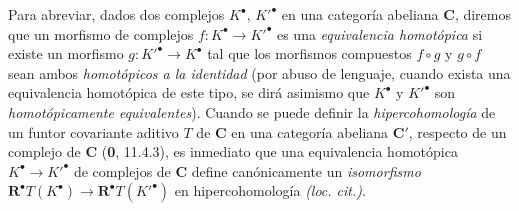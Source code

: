 \begin{env}[6.1.4]
\label{III.6.1.4}
Para abreviar, dados dos complejos $K^\bullet$, $K'^\bullet$ en una categoría
abeliana $\boldsymbol{C}$, diremos que un morfismo de complejos
$f:K^\bullet\to K'^\bullet$ es una \emph{equivalencia homotópica} si existe un
morfismo $g:K'^\bullet\to K^\bullet$ tal que los morfismos compuestos
$f\circ g$ y $g\circ f$ sean ambos \emph{homotópicos a la identidad} (por abuso de
lenguaje, cuando exista una equivalencia homotópica de este tipo, se dirá
asimismo que $K^\bullet$ y $K'^\bullet$ son \emph{homotópicamente equivalentes}).
Cuando se puede definir la \emph{hipercohomología} de un funtor covariante aditivo
$T$ de $\boldsymbol{C}$ en una categoría abeliana $\boldsymbol{C}'$, respecto de un complejo de $\boldsymbol{C}$
(\textbf 0, 11.4.3), es inmediato que una equivalencia homotópica
$K^\bullet\to K'^\bullet$ de complejos de $\boldsymbol{C}$ define canónicamente un
\emph{isomorfismo}
$\mathbf R^\bullet T(K^\bullet)\to\mathbf R^\bullet T(K'^\bullet)$
en hipercohomología \emph{(loc. cit.)}.
\end{env}
